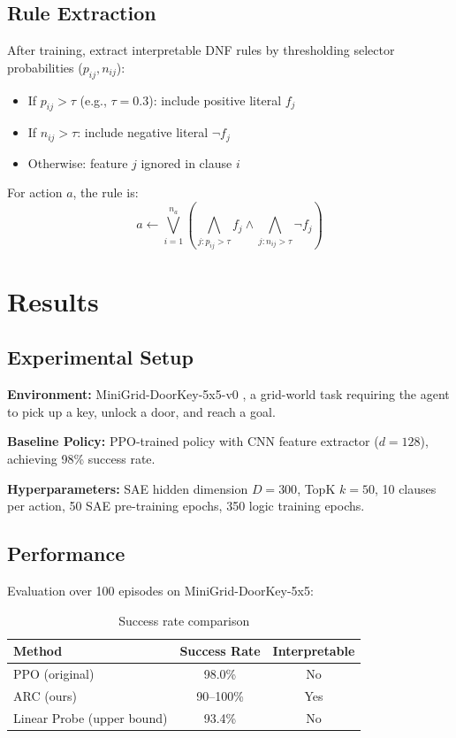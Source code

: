 \documentclass[11pt,twocolumn]{article}
\begin{document}
\subsection{Rule Extraction}

After training, extract interpretable DNF rules by thresholding selector probabilities ($p_{ij}, n_{ij}$):
\begin{itemize}
\item If $p_{ij} > \tau$ (e.g., $\tau=0.3$): include positive literal $f_j$
\item If $n_{ij} > \tau$: include negative literal $\neg f_j$
\item Otherwise: feature $j$ ignored in clause $i$
\end{itemize}

For action $a$, the rule is:
\begin{equation}
a \leftarrow \bigvee_{i=1}^{n_a} \left(\bigwedge_{j: p_{ij}>\tau} f_j \land \bigwedge_{j: n_{ij}>\tau} \neg f_j\right)
\end{equation}

\section{Results}

\subsection{Experimental Setup}

\textbf{Environment:} MiniGrid-DoorKey-5x5-v0 \cite{minigrid}, a grid-world task requiring the agent to pick up a key, unlock a door, and reach a goal.

\textbf{Baseline Policy:} PPO-trained policy with CNN feature extractor ($d=128$), achieving 98\% success rate.

\textbf{Hyperparameters:} SAE hidden dimension $D=300$, TopK $k=50$, 10 clauses per action, 50 SAE pre-training epochs, 350 logic training epochs.

\subsection{Performance}

Evaluation over 100 episodes on MiniGrid-DoorKey-5x5:

\begin{table}[h]
\centering
\caption{Success rate comparison}
\begin{tabular}{lcc}
\toprule
Method & Success Rate & Interpretable \\
\midrule
PPO (original) & 98.0\% & No \\
ARC (ours) & 90--100\% & Yes \\
Linear Probe (upper bound) & 93.4\% & No \\
\bottomrule
\end{tabular}
\end{table}
\end{document}
